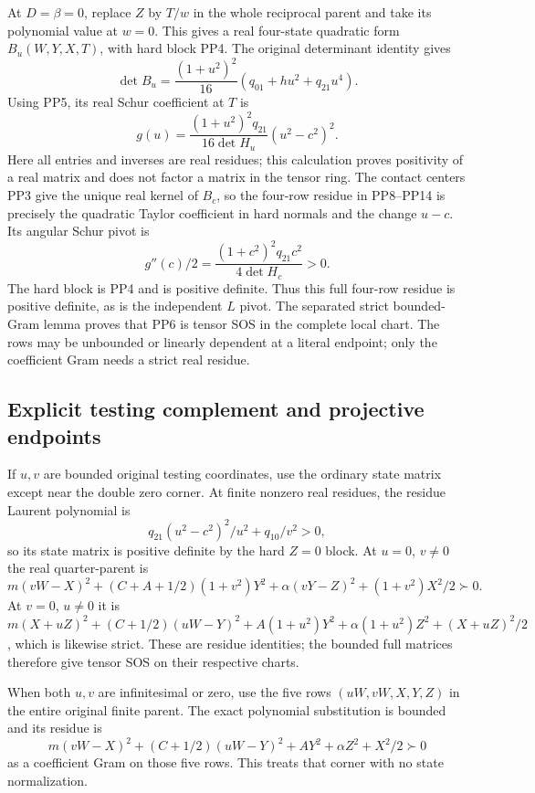 At $D=\beta=0$, replace $Z$ by $T/w$ in the whole reciprocal
parent and take its polynomial value at $w=0$. This gives a real
four-state quadratic form $B_u(W,Y,X,T)$, with hard block PP4.
The original determinant identity gives
\[
 \det B_u=\frac{(1+u^2)^2}{16}
                  (q_{01}+hu^2+q_{21}u^4).
 \tag{PP15}
\]
Using PP5, its real Schur coefficient at $T$ is
\[
 g(u)=\frac{(1+u^2)^2q_{21}}{16\det H_u}
                       (u^2-c^2)^2.
 \tag{PP16}
\]
Here all entries and inverses are real residues; this calculation
proves positivity of a real matrix and does not factor a matrix in
the tensor ring. The contact centers PP3 give the unique real
kernel of $B_c$, so the four-row residue in PP8--PP14 is precisely
the quadratic Taylor coefficient in hard normals and the change
$u-c$. Its angular Schur pivot is
\[
 g''(c)/2=\frac{(1+c^2)^2q_{21}c^2}{4\det H_c}>0.
 \tag{PP17}
\]
The hard block is PP4 and is positive definite. Thus this full
four-row residue is positive definite, as is the independent $L$
pivot. The separated strict bounded-Gram lemma proves that PP6
is tensor SOS in the complete local chart. The rows may be
unbounded or linearly dependent at a literal endpoint; only the
coefficient Gram needs a strict real residue.

\subsection{Explicit testing complement and projective endpoints}

If $u,v$ are bounded original testing coordinates, use the ordinary
state matrix except near the double zero corner. At finite nonzero
real residues, the residue Laurent polynomial is
\[
 q_{21}(u^2-c^2)^2/u^2+q_{10}/v^2>0,
 \tag{PP18}
\]
so its state matrix is positive definite by the hard $Z=0$ block.
At $u=0$, $v\ne0$ the real quarter-parent is
\[
 m(vW-X)^2+(C+A+1/2)(1+v^2)Y^2
                       +\alpha(vY-Z)^2+(1+v^2)X^2/2\succ0.
\]
At $v=0$, $u\ne0$ it is
$m(X+uZ)^2+(C+1/2)(uW-Y)^2+A(1+u^2)Y^2
+\alpha(1+u^2)Z^2+(X+uZ)^2/2$, which is likewise strict.
These are residue identities; the bounded full matrices therefore
give tensor SOS on their respective charts.

When both $u,v$ are infinitesimal or zero, use the five rows
$(uW,vW,X,Y,Z)$ in the entire original finite parent. The exact
polynomial substitution is bounded and its residue is
\[
 m(vW-X)^2+(C+1/2)(uW-Y)^2+AY^2+\alpha Z^2+X^2/2\succ0
 \tag{PP19}
\]
as a coefficient Gram on those five rows. This treats that corner
with no state normalization.

